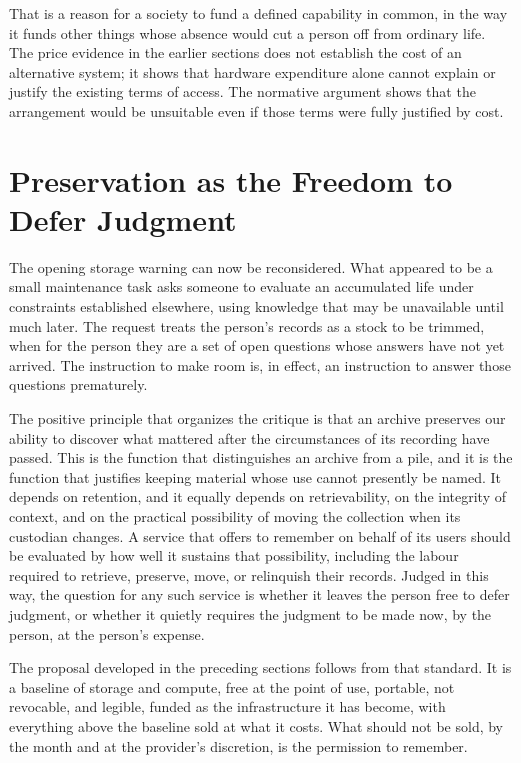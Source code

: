 \documentclass[12pt]{article}
\begin{document}
That is a reason for a society to fund a defined capability in common, in the way it funds other things whose absence would cut a person off from ordinary life. The price evidence in the earlier sections does not establish the cost of an alternative system; it shows that hardware expenditure alone cannot explain or justify the existing terms of access. The normative argument shows that the arrangement would be unsuitable even if those terms were fully justified by cost.

\section{Preservation as the Freedom to Defer Judgment}

The opening storage warning can now be reconsidered. What appeared to be a small maintenance task asks someone to evaluate an accumulated life under constraints established elsewhere, using knowledge that may be unavailable until much later. The request treats the person's records as a stock to be trimmed, when for the person they are a set of open questions whose answers have not yet arrived. The instruction to make room is, in effect, an instruction to answer those questions prematurely.

The positive principle that organizes the critique is that an archive preserves our ability to discover what mattered after the circumstances of its recording have passed. This is the function that distinguishes an archive from a pile, and it is the function that justifies keeping material whose use cannot presently be named. It depends on retention, and it equally depends on retrievability, on the integrity of context, and on the practical possibility of moving the collection when its custodian changes. A service that offers to remember on behalf of its users should be evaluated by how well it sustains that possibility, including the labour required to retrieve, preserve, move, or relinquish their records. Judged in this way, the question for any such service is whether it leaves the person free to defer judgment, or whether it quietly requires the judgment to be made now, by the person, at the person's expense.

The proposal developed in the preceding sections follows from that standard. It is a baseline of storage and compute, free at the point of use, portable, not revocable, and legible, funded as the infrastructure it has become, with everything above the baseline sold at what it costs. What should not be sold, by the month and at the provider's discretion, is the permission to remember.
\end{document}
